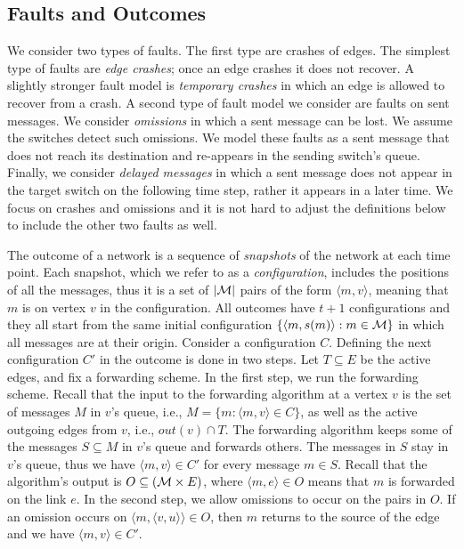\documentclass[11pt,eepic]{article}
\newcommand{\zug}[1]{\langle #1  \rangle}
\newcommand{\set}[1]{\{ #1  \}}
\newcommand{\M}{{\cal M}}
\begin{document}
	\subsection*{Faults and Outcomes}
		We consider two types of faults. The first type are crashes of edges. The simplest type of faults are {\em edge crashes}; once an edge crashes it does not recover. A slightly stronger fault model is {\em temporary crashes} in which an edge is allowed to recover from a crash. A second type of fault model we consider are faults on sent messages. We consider {\em omissions} in which a sent message can be lost. We assume the switches detect such omissions. We model these faults as a sent message that does not reach its destination and re-appears in the sending switch's queue. 
		Finally, we consider {\em delayed messages} in which a sent message does not appear in the target switch on the following time step, rather it appears in a later time. We focus on crashes and omissions and it is not hard to adjust the definitions below to include the other two faults as well.

		The outcome of a network is a sequence of {\em snapshots} of the network at each time point. Each snapshot, which we refer to as a {\em configuration}, includes the positions of all the messages, thus it is a set of $|\M|$ pairs of the form $\zug{m,v}$, meaning that $m$ is on vertex $v$ in the configuration. All outcomes have $t+1$ configurations and they all start from the same initial configuration $\set{\zug{m, s(m)}: m \in \M}$ in which all messages are at their origin. Consider a configuration $C$. Defining the next configuration $C'$ in the outcome is done in two steps. Let $T \subseteq E$ be the active edges, and fix a  forwarding scheme. In the first step, we run the forwarding scheme. Recall that the input to the forwarding algorithm at a vertex $v$ is the set of messages $M$ in $v$'s queue, i.e., $M = \set{m: \zug{m,v} \in C}$, as well as the active outgoing edges from $v$, i.e., $out(v) \cap T$. The forwarding algorithm keeps some of the messages $S \subseteq M$ in $v$'s queue and forwards others. The messages in $S$ stay in $v$'s queue, thus we have $\zug{m,v} \in C'$ for every message $m\in S$. Recall that the algorithm's output is $O \subseteq (\M \times E)$, where $\zug{m, e} \in O$ means that $m$ is forwarded on the link $e$. In the second step, we allow omissions to occur on the pairs in $O$. If an omission occurs on $\zug{m, \zug{v,u}} \in O$, then $m$ returns to the source of the edge and we have $\zug{m,v} \in C'$. 
\end{document}
